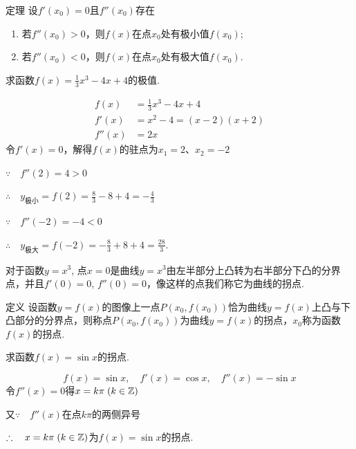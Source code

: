 \begin{thm}
    {定理} 设$f'(x_0)=0$且$f''(x_0)$存在
\begin{enumerate}[(1)]
\item 若$f''(x_0)>0$，则$f(x)$在点$x_0$处有极小值$f(x_0)$;
\item 若$f''(x_0)<0$，则$f(x)$在点$x_0$处有极大值$f(x_0)$.
\end{enumerate}
\end{thm}


\begin{example}
    求函数$f(x)=\frac{1}{3}x^3-4x+4$的极值.
\end{example}

\begin{solution}
\[\begin{split}
    f(x)&=\frac{1}{3}x^3-4x+4\\
f'(x)&=x^2-4=(x-2)(x+2)\\
f''(x)&=2x
\end{split}\]
令$f'(x)=0$，解得$f(x)$的驻点为$x_1=2$、$x_2=-2$

$\because\quad f''(2)=4>0$

$\therefore\quad y_{\text{极小}}=f(2)=\frac{8}{3}-8+4=-\frac{4}{3}$

$\because\quad f''(-2)=-4<0$

$\therefore\quad y_{\text{极大}}=f(-2)=-\frac{8}{3}+8+4=\frac{28}{3}$.

对于函数$y=x^3$, 点$x=0$是曲线$y=x^3$由左半部分上凸转为右半部分下凸的分界点，并且$f'(0)=0$, $f''(0)=0$，像这样的点我们称它为曲线的拐点.
\end{solution}

\begin{thm}
    {定义} 设函数$y=f(x)$的图像上一点$P(x_0,f(x_0))$恰为曲线$y=f(x)$上凸与下凸部分的分界点，则称点$P(x_0, f(x_0))$为曲线$y=f(x)$的拐点，$x_0$称为函数$f(x)$的拐点.
\end{thm}



\begin{example}
    求函数$f(x)=\sin x$的拐点.
\end{example}

\begin{solution}
    \[f(x)=\sin x,\quad f'(x)=\cos x,\quad f''(x)=-\sin x\]
令$f''(x)=0$得$x=k\pi\; (k\in\mathbb{Z})$

又$\because\quad f''(x)$在点$k\pi$的两侧异号

$\therefore\quad x=k\pi\; (k\in\mathbb{Z})$为$f(x)=\sin x$的拐点.
\end{solution}

